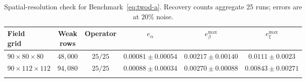 \begin{table}[t]
\centering
\caption{Spatial-resolution check for Benchmark~\eqref{eq:twod-a}. Recovery counts aggregate 25 runs; errors are at $20\%$ noise.}\label{tab:twod-resolution}
\footnotesize
\setlength{\tabcolsep}{1.2pt}
\begin{tabular*}{\textwidth}{@{\extracolsep\fill}lccccc}
\toprule
\shortstack{Field\\grid} & \shortstack{Weak\\rows} & Operator & $e_\alpha$ & $e_\beta^{\max}$ & $e_\xi^{\max}$ \\
\midrule
$90\times80\times80$ & $48{,}000$ & $25/25$ & $0.00081\pm0.00054$ & $0.00217\pm0.00140$ & $0.0111\pm0.0023$ \\
$90\times112\times112$ & $94{,}080$ & $25/25$ & $0.00088\pm0.00034$ & $0.00270\pm0.00088$ & $0.00843\pm0.00271$ \\
\botrule
\end{tabular*}
\end{table}

\FloatBarrier
